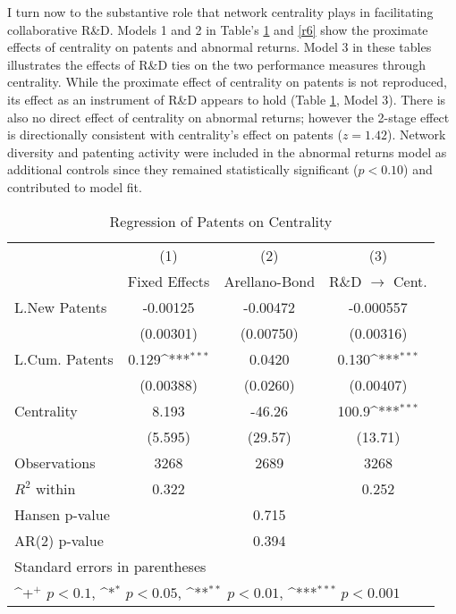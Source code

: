 I turn now to the substantive role that network centrality plays in facilitating collaborative R\&D. Models 1 and 2 in Table's \ref{r5} and \ref{r6} show the proximate effects of centrality on patents and abnormal returns. Model 3 in these tables illustrates the effects of R\&D ties on the two performance measures through centrality. While the proximate effect of centrality on patents is not reproduced, its effect as an instrument of R\&D appears to hold (Table \ref{r5}, Model 3). There is also no direct effect of centrality on abnormal returns; however the 2-stage effect is directionally consistent with centrality's effect on patents ($z=1.42$). Network diversity and patenting activity were included in the abnormal returns model as additional controls since they remained statistically significant ($p < 0.10$) and contributed to model fit.

\begin{table}[htbp]\centering \caption{Regression of Patents on Centrality \label{r5}}
{
\def\sym#1{\ifmmode^{#1}\else\(^{#1}\)\fi}
\begin{tabular}{l*{3}{c}}
\hline\hline
                    &\multicolumn{1}{c}{(1)}&\multicolumn{1}{c}{(2)}&\multicolumn{1}{c}{(3)}\\
                    &\multicolumn{1}{c}{Fixed Effects}&\multicolumn{1}{c}{Arellano-Bond}&\multicolumn{1}{c}{R\&D $\rightarrow$ Cent.}\\
\hline
L.New Patents       &    -0.00125         &    -0.00472         &   -0.000557         \\
                    &   (0.00301)         &   (0.00750)         &   (0.00316)         \\
L.Cum. Patents      &       0.129\sym{***}&      0.0420         &       0.130\sym{***}\\
                    &   (0.00388)         &    (0.0260)         &   (0.00407)         \\
Centrality          &       8.193         &      -46.26         &       100.9\sym{***}\\
                    &     (5.595)         &     (29.57)         &     (13.71)         \\
\hline
Observations        &        3268         &        2689         &        3268         \\
$R^2$ within                &       0.322         &                     &       0.252         \\
Hansen p-value             &                     &       0.715         &                     \\
AR(2) p-value                &                     &       0.394         &                     \\
\hline\hline
\multicolumn{4}{l}{\footnotesize Standard errors in parentheses}\\
\multicolumn{4}{l}{\footnotesize \sym{+} \(p<0.1\), \sym{*} \(p<0.05\), \sym{**} \(p<0.01\), \sym{***} \(p<0.001\)}\\
\end{tabular}
}
\end{table}

